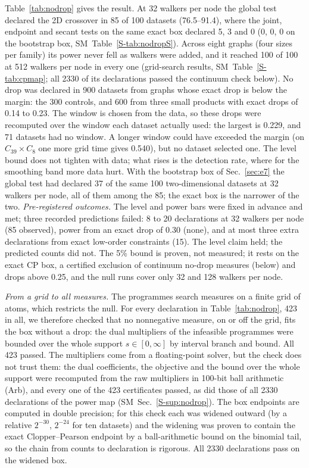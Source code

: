 \documentclass[aps,pre,twocolumn,superscriptaddress,nofootinbib,10pt]{revtex4-2}
\newcommand{\SM}{SM}
\begin{document}
Table~\ref{tab:nodrop} gives the result. At 32 walkers per node the global test declared the 2D crossover in 85 of 100 datasets (76.5--91.4), where the joint, endpoint and secant tests on the same exact box declared 5, 3 and 0 (0, 0, 0 on the bootstrap box, \SM\ Table~\ref{S-tab:nodropS}). Across eight graphs (four sizes per family) its power never fell as walkers were added, and it reached 100 of 100 at 512 walkers per node in every one (grid-search results, \SM\ Table~\ref{S-tab:cpmap}; all 2330 of its declarations passed the continuum check below). No drop was declared in 900 datasets from graphs whose exact drop is below the margin: the 300 controls, and 600 from three small products with exact drops of 0.14 to 0.23. The window is chosen from the data, so these drops were recomputed over the window each dataset actually used: the largest is 0.229, and 71 datasets had no window. A longer window could have exceeded the margin (on $C_{39}\times C_8$ one more grid time gives 0.540), but no dataset selected one. The level bound does not tighten with data; what rises is the detection rate, where for the smoothing band more data hurt. With the bootstrap box of Sec.~\ref{sec:e7} the global test had declared 37 of the same 100 two-dimensional datasets at 32 walkers per node, all of them among the 85; the exact box is the narrower of the two. \emph{Pre-registered outcomes.} The level and power bars were fixed in advance and met; three recorded predictions failed: 8 to 20 declarations at 32 walkers per node (85 observed), power from an exact drop of 0.30 (none), and at most three extra declarations from exact low-order constraints (15). The level claim held; the predicted counts did not. The 5\% bound is proven, not measured; it rests on the exact CP box, a certified exclusion of continuum no-drop measures (below) and drops above 0.25, and the null runs cover only 32 and 128 walkers per node.

\emph{From a grid to all measures.} The programmes search measures on a finite grid of atoms, which restricts the null. For every declaration in Table~\ref{tab:nodrop}, 423 in all, we therefore checked that no nonnegative measure, on or off the grid, fits the box without a drop: the dual multipliers of the infeasible programmes were bounded over the whole support $s\in[0,\infty]$ by interval branch and bound. All 423 passed. The multipliers come from a floating-point solver, but the check does not trust them: the dual coefficients, the objective and the bound over the whole support were recomputed from the raw multipliers in 100-bit ball arithmetic (Arb), and every one of the 423 certificates passed, as did those of all 2330 declarations of the power map (\SM\ Sec.~\ref{S-sup:nodrop}). The box endpoints are computed in double precision; for this check each was widened outward (by a relative $2^{-30}$, $2^{-24}$ for ten datasets) and the widening was proven to contain the exact Clopper--Pearson endpoint by a ball-arithmetic bound on the binomial tail, so the chain from counts to declaration is rigorous. All 2330 declarations pass on the widened box.
\end{document}
